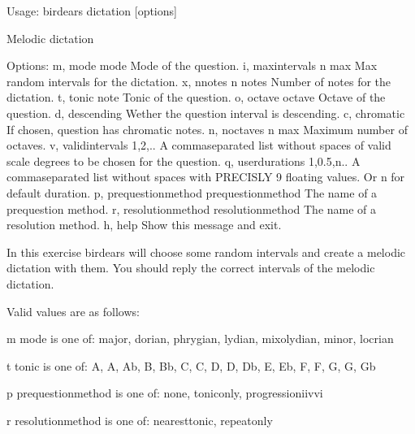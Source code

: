 \documentclass[letterpaper,10pt,english]{sphinxmanual}
\begin{document}
%
\begin{sphinxVerbatim}[commandchars=\\\{\}]
Usage: birdears dictation [options]

  Melodic dictation

Options:
  \PYGZhy{}m, \PYGZhy{}\PYGZhy{}mode \PYGZlt{}mode\PYGZgt{}               Mode of the question.
  \PYGZhy{}i, \PYGZhy{}\PYGZhy{}max\PYGZus{}intervals \PYGZlt{}n max\PYGZgt{}     Max random intervals for the dictation.
  \PYGZhy{}x, \PYGZhy{}\PYGZhy{}n\PYGZus{}notes \PYGZlt{}n notes\PYGZgt{}         Number of notes for the dictation.
  \PYGZhy{}t, \PYGZhy{}\PYGZhy{}tonic \PYGZlt{}note\PYGZgt{}              Tonic of the question.
  \PYGZhy{}o, \PYGZhy{}\PYGZhy{}octave \PYGZlt{}octave\PYGZgt{}           Octave of the question.
  \PYGZhy{}d, \PYGZhy{}\PYGZhy{}descending                Wether the question interval is descending.
  \PYGZhy{}c, \PYGZhy{}\PYGZhy{}chromatic                 If chosen, question has chromatic notes.
  \PYGZhy{}n, \PYGZhy{}\PYGZhy{}n\PYGZus{}octaves \PYGZlt{}n max\PYGZgt{}         Maximum number of octaves.
  \PYGZhy{}v, \PYGZhy{}\PYGZhy{}valid\PYGZus{}intervals \PYGZlt{}1,2,..\PYGZgt{}  A comma\PYGZhy{}separated list without spaces
                                  of valid scale degrees to be chosen for the
                                  question.
  \PYGZhy{}q, \PYGZhy{}\PYGZhy{}user\PYGZus{}durations \PYGZlt{}1,0.5,n..\PYGZgt{}
                                  A comma\PYGZhy{}separated list without
                                  spaces with PRECISLY 9 floating values. Or
                                  \PYGZsq{}n\PYGZsq{} for default              duration.
  \PYGZhy{}p, \PYGZhy{}\PYGZhy{}prequestion\PYGZus{}method \PYGZlt{}prequestion\PYGZus{}method\PYGZgt{}
                                  The name of a pre\PYGZhy{}question method.
  \PYGZhy{}r, \PYGZhy{}\PYGZhy{}resolution\PYGZus{}method \PYGZlt{}resolution\PYGZus{}method\PYGZgt{}
                                  The name of a resolution method.
  \PYGZhy{}h, \PYGZhy{}\PYGZhy{}help                      Show this message and exit.

  In this exercise birdears will choose some random intervals and create a
  melodic dictation with them. You should reply the correct intervals of the
  melodic dictation.

  Valid values are as follows:

  \PYGZhy{}m \PYGZlt{}mode\PYGZgt{} is one of: major, dorian, phrygian, lydian, mixolydian, minor,
  locrian

  \PYGZhy{}t \PYGZlt{}tonic\PYGZgt{} is one of: A, A\PYGZsh{}, Ab, B, Bb, C, C\PYGZsh{}, D, D\PYGZsh{}, Db, E, Eb, F, F\PYGZsh{}, G,
  G\PYGZsh{}, Gb

  \PYGZhy{}p \PYGZlt{}prequestion\PYGZus{}method\PYGZgt{} is one of: none, tonic\PYGZus{}only, progression\PYGZus{}i\PYGZus{}iv\PYGZus{}v\PYGZus{}i

  \PYGZhy{}r \PYGZlt{}resolution\PYGZus{}method\PYGZgt{} is one of: nearest\PYGZus{}tonic, repeat\PYGZus{}only
\end{sphinxVerbatim}
\end{document}
